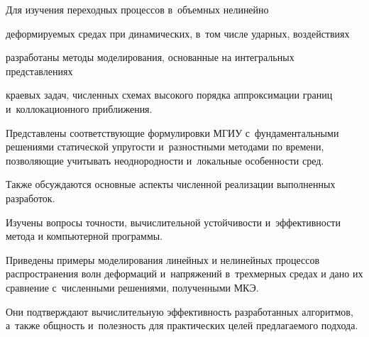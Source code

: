 \smallskip



 Для изучения переходных процессов в~объемных нелинейно

деформируемых средах при динамических, в~том числе ударных, воздействиях

разработаны методы моделирования, основанные на интегральных представлениях

краевых задач, численных схемах высокого порядка аппроксимации границ и~коллокационного приближения. 

Представлены соответствующие формулировки МГИУ с~фундаментальными решениями статической упругости и~разностными методами по времени, позволяющие учитывать неоднородности и~локальные особенности сред.



Также обсуждаются основные аспекты численной реализации выполненных разработок. 

Изучены вопросы точности, вычислительной устойчивости и~эффективности метода и компьютерной программы. 

Приведены примеры моделирования линейных и нелинейных процессов распространения волн деформаций и~напряжений в~трехмерных средах и дано их сравнение с~численными решениями, полученными МКЭ. 

Они подтверждают вычислительную эффективность разработанных алгоритмов, а~также общность и~полезность для практических целей предлагаемого подхода.
















